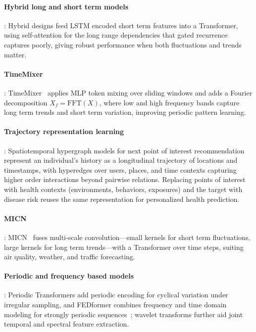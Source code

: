 \documentclass[journal]{IEEEtran}
\begin{document}
\paragraph{Hybrid long and short term models}: Hybrid designs feed LSTM encoded short term features into a Transformer, using self-attention for the long range dependencies that gated recurrence captures poorly, giving robust performance when both fluctuations and trends matter.

\paragraph{TimeMixer}: TimeMixer~\cite{timemixer} applies MLP token mixing over sliding windows and adds a Fourier decomposition $X_f=\mathrm{FFT}(X)$, where low and high frequency bands capture long term trends and short term variation, improving periodic pattern learning.

\paragraph{Trajectory representation learning}: Spatiotemporal hypergraph models for next point of interest recommendation~\cite{Zhang2023POI} represent an individual's history as a longitudinal trajectory of locations and timestamps, with hyperedges over users, places, and time contexts capturing higher order interactions beyond pairwise relations. Replacing points of interest with health contexts (environments, behaviors, exposures) and the target with disease risk reuses the same representation for personalized health prediction.

\paragraph{MICN}: MICN~\cite{wang2023micn} fuses multi-scale convolution---small kernels for short term fluctuations, large kernels for long term trends---with a Transformer over time steps, suiting air quality, weather, and traffic forecasting.

\paragraph{Periodic and frequency based models}: Periodic Transformers add periodic encoding for cyclical variation under irregular sampling, and FEDformer combines frequency and time domain modeling for strongly periodic sequences~\cite{zhou2022fedformer}; wavelet transforms further aid joint temporal and spectral feature extraction.
\end{document}
